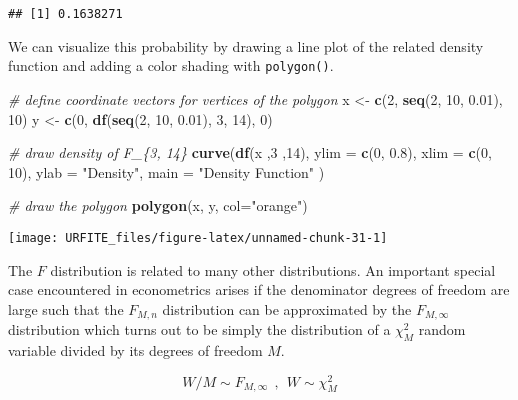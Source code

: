 \documentclass[]{book}
\newenvironment{Shaded}{\begin{snugshade}}{\end{snugshade}}
\newcommand{\KeywordTok}[1]{\textcolor[rgb]{0.13,0.29,0.53}{\textbf{#1}}}
\newcommand{\DataTypeTok}[1]{\textcolor[rgb]{0.13,0.29,0.53}{#1}}
\newcommand{\DecValTok}[1]{\textcolor[rgb]{0.00,0.00,0.81}{#1}}
\newcommand{\FloatTok}[1]{\textcolor[rgb]{0.00,0.00,0.81}{#1}}
\newcommand{\StringTok}[1]{\textcolor[rgb]{0.31,0.60,0.02}{#1}}
\newcommand{\CommentTok}[1]{\textcolor[rgb]{0.56,0.35,0.01}{\textit{#1}}}
\newcommand{\NormalTok}[1]{#1}
\theoremstyle{definition}
\theoremstyle{definition}
\theoremstyle{definition}
\theoremstyle{remark}
\begin{document}
\begin{verbatim}
## [1] 0.1638271
\end{verbatim}

We can visualize this probability by drawing a line plot of the related
density function and adding a color shading with \texttt{polygon()}.

\begin{Shaded}
\begin{Highlighting}[]
\CommentTok{# define coordinate vectors for vertices of the polygon}
\NormalTok{x <-}\StringTok{ }\KeywordTok{c}\NormalTok{(}\DecValTok{2}\NormalTok{, }\KeywordTok{seq}\NormalTok{(}\DecValTok{2}\NormalTok{, }\DecValTok{10}\NormalTok{, }\FloatTok{0.01}\NormalTok{), }\DecValTok{10}\NormalTok{)}
\NormalTok{y <-}\StringTok{ }\KeywordTok{c}\NormalTok{(}\DecValTok{0}\NormalTok{, }\KeywordTok{df}\NormalTok{(}\KeywordTok{seq}\NormalTok{(}\DecValTok{2}\NormalTok{, }\DecValTok{10}\NormalTok{, }\FloatTok{0.01}\NormalTok{), }\DecValTok{3}\NormalTok{, }\DecValTok{14}\NormalTok{), }\DecValTok{0}\NormalTok{)}

\CommentTok{# draw density of F_\{3, 14\}}
\KeywordTok{curve}\NormalTok{(}\KeywordTok{df}\NormalTok{(x ,}\DecValTok{3}\NormalTok{ ,}\DecValTok{14}\NormalTok{), }
      \DataTypeTok{ylim =} \KeywordTok{c}\NormalTok{(}\DecValTok{0}\NormalTok{, }\FloatTok{0.8}\NormalTok{), }
      \DataTypeTok{xlim =} \KeywordTok{c}\NormalTok{(}\DecValTok{0}\NormalTok{, }\DecValTok{10}\NormalTok{), }
      \DataTypeTok{ylab =} \StringTok{"Density"}\NormalTok{,}
      \DataTypeTok{main =} \StringTok{"Density Function"}
\NormalTok{      )}

\CommentTok{# draw the polygon}
\KeywordTok{polygon}\NormalTok{(x, y, }\DataTypeTok{col=}\StringTok{"orange"}\NormalTok{)}
\end{Highlighting}
\end{Shaded}

\begin{center}\texttt{[image: URFITE\_files/figure-latex/unnamed-chunk-31-1]} \end{center}

The \(F\) distribution is related to many other distributions. An
important special case encountered in econometrics arises if the
denominator degrees of freedom are large such that the \(F_{M,n}\)
distribution can be approximated by the \(F_{M,\infty}\) distribution
which turns out to be simply the distribution of a \(\chi^2_M\) random
variable divided by its degrees of freedom \(M\).

\[ W/M \sim F_{M,\infty} \ \ , \ \ W \sim \chi^2_M \]
\end{document}

